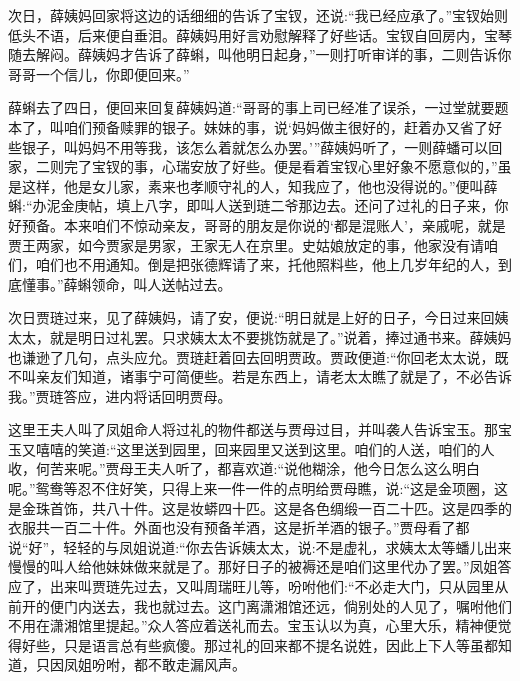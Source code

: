 \begin{parag}
    次日，薛姨妈回家将这边的话细细的告诉了宝钗，还说:“我已经应承了。”宝钗始则低头不语，后来便自垂泪。薛姨妈用好言劝慰解释了好些话。宝钗自回房内，宝琴随去解闷。薛姨妈才告诉了薛蝌，叫他明日起身，”一则打听审详的事，二则告诉你哥哥一个信儿，你即便回来。”
\end{parag}


\begin{parag}
    薛蝌去了四日，便回来回复薛姨妈道:“哥哥的事上司已经准了误杀，一过堂就要题本了，叫咱们预备赎罪的银子。妹妹的事，说‘妈妈做主很好的，赶着办又省了好些银子，叫妈妈不用等我，该怎么着就怎么办罢。’”薛姨妈听了，一则薛蟠可以回家，二则完了宝钗的事，心瑞安放了好些。便是看着宝钗心里好象不愿意似的，”虽是这样，他是女儿家，素来也孝顺守礼的人，知我应了，他也没得说的。”便叫薛蝌:“办泥金庚帖，填上八字，即叫人送到琏二爷那边去。还问了过礼的日子来，你好预备。本来咱们不惊动亲友，哥哥的朋友是你说的‘都是混账人’，亲戚呢，就是贾王两家，如今贾家是男家，王家无人在京里。史姑娘放定的事，他家没有请咱们，咱们也不用通知。倒是把张德辉请了来，托他照料些，他上几岁年纪的人，到底懂事。”薛蝌领命，叫人送帖过去。
\end{parag}


\begin{parag}
    次日贾琏过来，见了薛姨妈，请了安，便说:“明日就是上好的日子，今日过来回姨太太，就是明日过礼罢。只求姨太太不要挑饬就是了。”说着，捧过通书来。薛姨妈也谦逊了几句，点头应允。贾琏赶着回去回明贾政。贾政便道:“你回老太太说，既不叫亲友们知道，诸事宁可简便些。若是东西上，请老太太瞧了就是了，不必告诉我。”贾琏答应，进内将话回明贾母。
\end{parag}


\begin{parag}
    这里王夫人叫了凤姐命人将过礼的物件都送与贾母过目，并叫袭人告诉宝玉。那宝玉又嘻嘻的笑道:“这里送到园里，回来园里又送到这里。咱们的人送，咱们的人收，何苦来呢。”贾母王夫人听了，都喜欢道:“说他糊涂，他今日怎么这么明白呢。”鸳鸯等忍不住好笑，只得上来一件一件的点明给贾母瞧，说:“这是金项圈，这是金珠首饰，共八十件。这是妆蟒四十匹。这是各色绸缎一百二十匹。这是四季的衣服共一百二十件。外面也没有预备羊酒，这是折羊酒的银子。”贾母看了都说“好”，轻轻的与凤姐说道:“你去告诉姨太太，说:不是虚礼，求姨太太等蟠儿出来慢慢的叫人给他妹妹做来就是了。那好日子的被褥还是咱们这里代办了罢。”凤姐答应了，出来叫贾琏先过去，又叫周瑞旺儿等，吩咐他们:“不必走大门，只从园里从前开的便门内送去，我也就过去。这门离潇湘馆还远，倘别处的人见了，嘱咐他们不用在潇湘馆里提起。”众人答应着送礼而去。宝玉认以为真，心里大乐，精神便觉得好些，只是语言总有些疯傻。那过礼的回来都不提名说姓，因此上下人等虽都知道，只因凤姐吩咐，都不敢走漏风声。
\end{parag}


